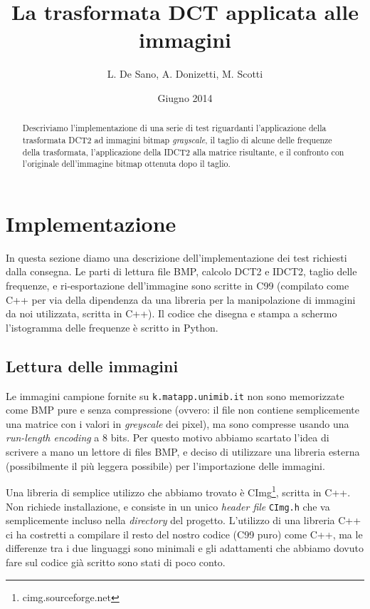 \documentclass[11pt,a4paper]{scrartcl}
\author{L. De Sano, A. Donizetti, M. Scotti}
\title{La trasformata DCT applicata alle immagini}
\date{Giugno 2014}
\begin{document}
\maketitle
\begin{abstract}
Descriviamo l'implementazione di una serie di test riguardanti l'applicazione della trasformata DCT2 ad immagini bitmap \textit{grayscale}, il taglio di alcune delle frequenze della trasformata, l'applicazione della IDCT2 alla matrice risultante, e il confronto con l'originale dell'immagine bitmap ottenuta dopo il taglio.
\end{abstract}

\section*{Implementazione}

In questa sezione diamo una descrizione dell'implementazione dei test richiesti dalla consegna. Le parti di lettura file BMP, calcolo DCT2 e IDCT2, taglio delle frequenze, e ri-esportazione dell'immagine sono scritte in C99 (compilato come C++ per via della dipendenza da una libreria per la manipolazione di immagini da noi utilizzata, scritta in C++). Il codice che disegna e stampa a schermo l'istogramma delle frequenze è scritto in Python.

\subsection*{Lettura delle immagini}

Le immagini campione fornite su \texttt{k.matapp.unimib.it} non sono memorizzate come BMP pure e senza compressione (ovvero: il file non contiene semplicemente una matrice con i valori in \emph{greyscale} dei pixel), ma sono compresse usando una \emph{run-length encoding} a 8 bits. Per questo motivo abbiamo scartato l'idea di scrivere a mano un lettore di files BMP, e deciso di utilizzare una libreria esterna (possibilmente il più leggera possibile) per l'importazione delle immagini.

Una libreria di semplice utilizzo che abbiamo trovato è CImg\footnote{cimg.sourceforge.net}, scritta in C++. Non richiede installazione, e consiste in un unico \emph{header file} \texttt{CImg.h} che va semplicemente incluso nella \emph{directory} del progetto. L'utilizzo di una libreria C++ ci ha costretti a compilare il resto del nostro codice (C99 puro) come C++, ma le differenze tra i due linguaggi sono minimali e gli adattamenti che abbiamo dovuto fare sul codice già scritto sono stati di poco conto.
\end{document}
